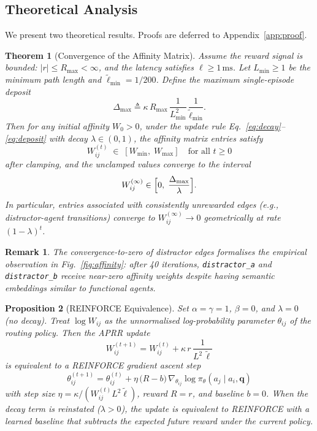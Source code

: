 \documentclass[journal,twocolumn,letterpaper]{IEEEtran}
\newtheorem{theorem}{Theorem}
\newtheorem{proposition}[theorem]{Proposition}
\newtheorem{remark}{Remark}
\newcommand{\APRR}{\textsc{APRR}}
\newcommand{\defeq}{\triangleq}
\begin{document}
\subsection{Theoretical Analysis}

We present two theoretical results.  Proofs are deferred to
Appendix~\ref{app:proof}.

\begin{theorem}[Convergence of the Affinity Matrix]
\label{thm:convergence}
Assume the reward signal is bounded: $|r|\leq R_{\max}<\infty$, and the
latency satisfies $\ell\geq 1\,\mathrm{ms}$.  Let $L_{\min}\geq 1$ be the
minimum path length and $\tilde{\ell}_{\min}=1/200$.  Define the maximum
single-episode deposit
\[
  \Delta_{\max} \defeq \kappa\,R_{\max}\,\frac{1}{L_{\min}^2}\,\frac{1}{\tilde{\ell}_{\min}}.
\]
Then for any initial affinity $W_0>0$, under the update rule
Eq.~\eqref{eq:decay}--\eqref{eq:deposit} with decay $\lambda\in(0,1)$, the
affinity matrix entries satisfy
\[
  W_{ij}^{(t)} \;\in\; [W_{\min},\; W_{\max}]
  \quad\text{for all }t\geq 0
\]
after clamping, and the unclamped values converge to the interval
\[
  W_{ij}^{(\infty)} \in \Bigl[0,\;\frac{\Delta_{\max}}{\lambda}\Bigr].
\]
In particular, entries associated with consistently unrewarded edges
(e.g., distractor-agent transitions) converge to
$W_{ij}^{(\infty)}\to 0$ geometrically at rate $(1-\lambda)^t$.
\end{theorem}

\begin{remark}
The convergence-to-zero of distractor edges formalises the empirical
observation in Fig.~\ref{fig:affinity}: after 40 iterations,
\texttt{distractor\_a} and \texttt{distractor\_b} receive near-zero affinity
weights despite having semantic embeddings similar to functional agents.
\end{remark}

\begin{proposition}[REINFORCE Equivalence]
\label{prop:reinforce}
Set $\alpha=\gamma=1$, $\beta=0$, and $\lambda=0$ (no decay).  Treat
$\log W_{ij}$ as the unnormalised log-probability parameter $\theta_{ij}$ of
the routing policy.  Then the \APRR{} update
\[
  W_{ij}^{(t+1)} = W_{ij}^{(t)} + \kappa\,r\,\frac{1}{L^2\,\tilde{\ell}}
\]
is equivalent to a REINFORCE gradient ascent step \cite{williams1992reinforce}
\[
  \theta_{ij}^{(t+1)} = \theta_{ij}^{(t)}
    + \eta\,\bigl(R-b\bigr)\,\nabla_{\theta_{ij}}\log\pi_\theta(a_j\mid a_i,\mathbf{q})
\]
with step size $\eta=\kappa/(W_{ij}^{(t)}L^2\tilde{\ell})$, reward
$R=r$, and baseline $b=0$.  When the decay term is reinstated
($\lambda>0$), the update is equivalent to REINFORCE with a learned baseline
that subtracts the expected future reward under the current policy.
\end{proposition}
\end{document}

